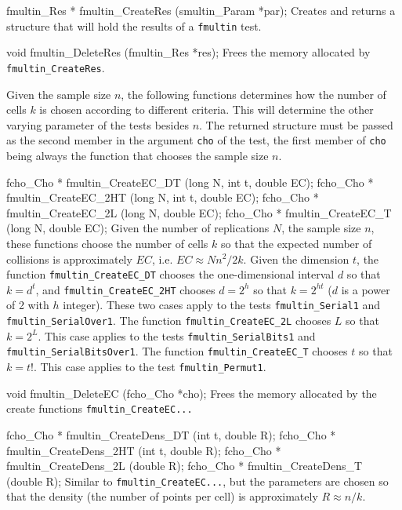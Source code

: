 fmultin_Res * fmultin_CreateRes (smultin_Param *par);
\endcode
 \tab 
  Creates and returns a structure that will hold the results
  of a  {\tt fmultin} test. 
 \endtab
\code


void fmultin_DeleteRes (fmultin_Res *res);
\endcode
 \tab 
  Frees the memory allocated by {\tt fmultin\_CreateRes}.
 \endtab

\fi %


  Given the sample size $n$, the following functions determines
  how the number of cells $k$ is chosen according to different criteria.
  This will determine the other varying parameter of the tests besides $n$.
  The returned structure must be passed as the second member in the
  argument {\tt cho} of the test, the first member of {\tt cho} being always 
  the function that chooses the sample size $n$.
\code


fcho_Cho * fmultin_CreateEC_DT (long N, int t, double EC);
fcho_Cho * fmultin_CreateEC_2HT (long N, int t, double EC);
fcho_Cho * fmultin_CreateEC_2L (long N, double EC);
fcho_Cho * fmultin_CreateEC_T (long N, double EC);
\endcode
 \tab 
  Given the number of replications $N$, the sample size $n$, these
  functions choose the number of cells $k$ so that the expected
  number of collisions is approximately $EC$, i.e. $EC \approx Nn^2/2k$.
  Given the dimension $t$, the function {\tt fmultin\_CreateEC\_DT}
  chooses the one-dimensional interval $d$ so that $k= d^t$, and 
  {\tt fmultin\_CreateEC\_2HT} chooses $d=2^h$
  so that $k= 2^{ht}$ ($d$ is a power of 2 with $h$ integer).
  These two cases apply to the tests {\tt fmultin\_Serial1} and
  {\tt fmultin\_SerialOver1}.
  The function {\tt fmultin\_CreateEC\_2L} chooses  $L$ so that $k= 2^L$.
  This case applies to the tests {\tt fmultin\_SerialBits1} and
  {\tt fmultin\_SerialBitsOver1}.
  The function {\tt fmultin\_CreateEC\_T} chooses  $t$ so that $k= t!$.
  This case applies to the test {\tt fmultin\_Permut1}.
 \endtab
\code


void fmultin_DeleteEC (fcho_Cho *cho);
\endcode
 \tab 
  Frees the memory allocated by the create functions
 {\tt fmultin\_CreateEC...}
 \endtab
\code


fcho_Cho * fmultin_CreateDens_DT (int t, double R);
fcho_Cho * fmultin_CreateDens_2HT (int t, double R);
fcho_Cho * fmultin_CreateDens_2L (double R);
fcho_Cho * fmultin_CreateDens_T (double R);
\endcode
\tab  Similar to {\tt fmultin\_CreateEC...}, but the parameters are chosen
   so that the density (the number of points per cell) is approximately
   $R \approx n/k $.
\endtab
\code


